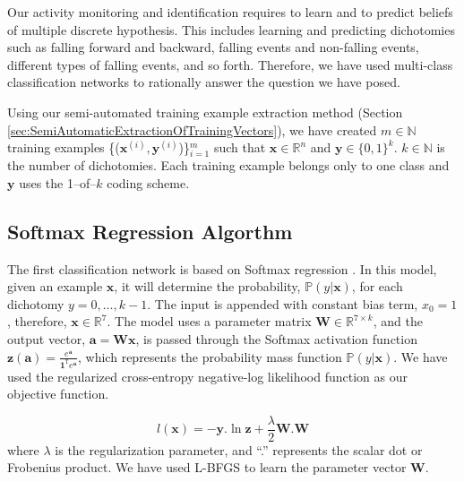 \documentclass{IEEEtran}
\begin{document}
Our activity monitoring and identification requires to learn and to predict beliefs of 
multiple 
discrete hypothesis. This includes learning and predicting dichotomies such as falling 
forward and 
backward, falling events and non-falling events, different types of falling events, and 
so forth. 
Therefore, 
we have used multi-class classification networks to rationally answer the question we 
have posed.

Using our semi-automated training example extraction method (Section 
\ref{sec:SemiAutomaticExtractionOfTrainingVectors}), we have created $m \in 
\mathbb{N}$ 
training examples 
\{($\mathbf{x}^{(i)}, \mathbf{y}^{(i)}$)\}$_{i=1}^m$ such that $\mathbf{x} \in 
\mathbb{R}^{n}$ 
and 
$\mathbf{y} \in 
\{0,1\}^k$. $k \in 
\mathbb{N}$ is the number of dichotomies. Each training example belongs only to one class 
and $\mathbf{y}$ uses the 1--of--$k$ coding scheme.    

\subsection{Softmax Regression Algorthm}
\label{sec:SoftmaxRegrationAlgorthm}

The first classification network is based on Softmax regression \cite{Bishop06a}. In this 
model, given an 
example $\mathbf{x}$, it will determine the probability, $\mathbb{P}(y | \mathbf{x})$, 
for 
each dichotomy $y=0,\ldots,k-1$. The input is appended with constant bias 
term, $x_0 = 1$, therefore, $\mathbf{x} \in \mathbb{R}^7$. The model uses a parameter 
matrix 
$\mathbf{W} 
\in \mathbb{R}^{7 \times k}$, and the output vector, $\mathbf{a} = \mathbf{Wx}$, is 
passed 
through 
the 
Softmax 
activation function $\mathbf{z(a)} = \frac{e^{\mathbf{a}}}{\mathbf{1}^\mathtt{T}
e^{\mathbf{a}}}$, which represents the probability mass function $\mathbb{P}(y | 
\mathbf{x})$. We have 
used the regularized cross-entropy negative-log likelihood function as our objective function. 

\begin{equation} 
l(\mathbf{x}) = -\mathbf{y}.\ln \mathbf{z} + \frac{\lambda}{2} \mathbf{W}.\mathbf{W}
\label{eq:objective-function}
\end{equation}
 where  $\lambda$ is the regularization parameter, and ``.'' represents the scalar dot  
or Frobenius product.
 We have used L-BFGS \cite{DBLP:conf/icml/LeNCLPN11} to learn the 
parameter vector $\mathbf{W}$.  
\end{document}
